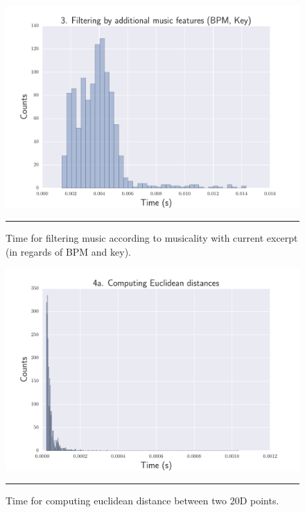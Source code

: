 \begin{figure}[h]
\begin{center}
\includegraphics[scale=0.7]{Figures/bench_bpm_filters.pdf}
    \rule{10em}{0.5pt}
  \caption[Time for filtering music according to musicality with current excerpt]{Time for filtering music according to musicality with current excerpt (in regards of BPM and key).}
  \label{fig:step3}
\end{center}
\end{figure}

\begin{figure}[h]
\begin{center}
\includegraphics[scale=0.7]{Figures/bench_euclidean.pdf}
    \rule{10em}{0.5pt}
  \caption[Time for computing euclidean distance]{Time for computing euclidean distance between two 20D points.}
  \label{fig:step4}
\end{center}
\end{figure}

